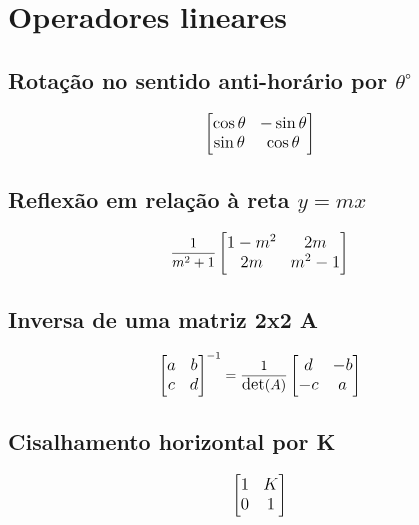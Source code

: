 \documentclass[10pt, a4paper, oneside]{book}
\begin{document}
\section{Operadores lineares}


\subsection{Rotação no sentido anti-horário por $\theta ^\circ$}

\begin{equation*} 
\large
\begin{bmatrix}
    \cos \theta & -\sin \theta \\
    \sin \theta & \cos \theta
\end{bmatrix}
\end{equation*}


\subsection{Reflexão em relação à reta $y = mx$ }

\begin{equation*}
\large
\frac{1}{m^2+1} 
\begin{bmatrix}
    1 - m^2 & 2m \\
    2m & m^2 - 1
\end{bmatrix}
\end{equation*} 


\subsection{Inversa de uma matriz 2x2 A}

\begin{equation*} 
\large 
\begin{bmatrix}
    a & b \\
    c & d
\end{bmatrix}^{-1} =
\frac{1}{\text{det}(A)}
\begin{bmatrix}
    d & -b \\
    -c & a
\end{bmatrix}
\end{equation*}


\subsection{Cisalhamento horizontal por K}

\begin{equation*} 
\large
\begin{bmatrix}
    1 & K \\
    0 & 1
\end{bmatrix}
\end{equation*}
\end{document}
